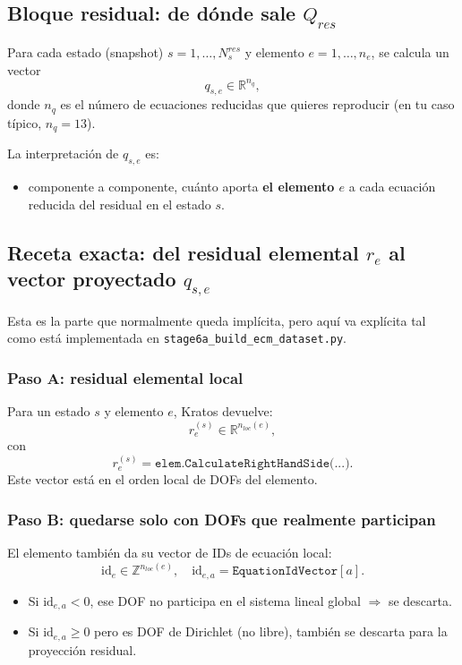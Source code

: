 \documentclass[11pt,a4paper]{article}
\begin{document}
\subsection{Bloque residual: de dónde sale $Q_{res}$}
Para cada estado (snapshot) $s=1,\dots,N_s^{res}$ y elemento
$e=1,\dots,n_e$, se calcula un vector
\[
q_{s,e}\in\mathbb{R}^{n_q},
\]
donde $n_q$ es el número de ecuaciones reducidas que quieres reproducir
(en tu caso típico, $n_q=13$).

La interpretación de $q_{s,e}$ es:
\begin{itemize}[leftmargin=1.5em]
\item componente a componente, cuánto aporta \textbf{el elemento $e$}
a cada ecuación reducida del residual en el estado $s$.
\end{itemize}

\subsection{Receta exacta: del residual elemental $r_e$ al vector proyectado $q_{s,e}$}
Esta es la parte que normalmente queda implícita, pero aquí va explícita tal como
está implementada en \texttt{stage6a\_build\_ecm\_dataset.py}.

\subsubsection*{Paso A: residual elemental local}
Para un estado $s$ y elemento $e$, Kratos devuelve:
\[
r_e^{(s)}\in\mathbb{R}^{n_{loc}(e)},
\]
con
\[
r_e^{(s)}=\texttt{elem.CalculateRightHandSide(...)}.
\]
Este vector está en el orden local de DOFs del elemento.

\subsubsection*{Paso B: quedarse solo con DOFs que realmente participan}
El elemento también da su vector de IDs de ecuación local:
\[
\mathrm{id}_e \in \mathbb{Z}^{n_{loc}(e)},
\quad
\mathrm{id}_{e,a}=\texttt{EquationIdVector}[a].
\]
\begin{itemize}[leftmargin=1.5em]
\item Si $\mathrm{id}_{e,a}<0$, ese DOF no participa en el sistema lineal global $\Rightarrow$ se descarta.
\item Si $\mathrm{id}_{e,a}\ge 0$ pero es DOF de Dirichlet (no libre), también se descarta para la proyección residual.
\end{itemize}
\end{document}

